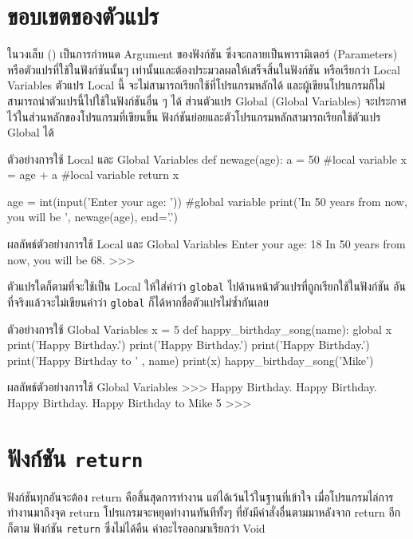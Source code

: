 \section{ขอบเขตของตัวแปร}

ในวงเล็บ () เป็นการกำหนด Argument ของฟังก์ชัน ซึ่งจะกลายเป็นพารามิเตอร์ (Parameters) หรือตัวแปรที่ใช้ในฟังก์ชันนั้นๆ เท่านั้นและต้องประมวลผลให้เสร็จสิ้นในฟังก์ชัน หรือเรียกว่า Local Variables ตัวแปร Local นี้ จะไม่สามารถเรียกใช้ที่โปรแกรมหลักได้ และผู้เขียนโปรแกรมก็ไม่สามารถนำตัวแปรนี้ไปใช้ในฟังก์ชันอื่น ๆ ได้ ส่วนตัวแปร Global (Global Variables) จะประกาศไว้ในส่วนหลักของโปรแกรมที่เขียนขึ้น ฟังก์ชันย่อยและตัวโปรแกรมหลักสามารถเรียกใช้ตัวแปร Global ได้

\begin{codelist}{ตัวอย่างการใช้ Local และ Global Variables}{}
def newage(age):
    a = 50 #local variable
    x = age + a #local variable
    return x

age = int(input('Enter your age: ')) #global variable
print('In 50 years from now, you will be ', newage(age), end='.')
\end{codelist}

\begin{codelist}{ผลลัพธ์ตัวอย่างการใช้ Local และ Global Variables}{}
Enter your age: 18
In 50 years from now, you will be  68.
>>> 
\end{codelist}


ตัวแปรใดก็ตามที่จะใช้เป็น Local ให้ใส่คำว่า \texttt{global} ไปด้านหน้าตัวแปรที่ถูกเรียกใช้ในฟังก์ชัน อันที่จริงแล้วจะไม่เขียนคำว่า \texttt{global}  ก็ได้หากชื่อตัวแปรไม่ซ้ำกันเลย

\begin{codelist}{ตัวอย่างการใช้ Global Variables}{}
x = 5
def happy_birthday_song(name):
    global x
    print('Happy Birthday.')
    print('Happy Birthday.')
    print('Happy Birthday.')
    print('Happy Birthday to ' , name)
    print(x)
happy_birthday_song('Mike')
\end{codelist}

\begin{codelist}{ผลลัพธ์ตัวอย่างการใช้ Global Variables}{}
>>>
Happy Birthday.
Happy Birthday.
Happy Birthday.
Happy Birthday to Mike
5
>>>
\end{codelist}

\section{ฟังก์ชัน \texttt{return}}

ฟังก์ชันทุกอันจะต้อง return คือสิ้นสุดการทำงาน แต่ได้เว้นไว้ในฐานที่เข้าใจ เมื่อโปรแกรมไล่การทำงานมาถึงจุด return โปรแกรมจะหยุดทำงานทันทีทั้งๆ ที่ยังมีคำสั่งอื่นตามมาหลังจาก return อีกก็ตาม  ฟังก์ชัน \texttt{return} ซึ่งไม่ได้คืน ค่าอะไรออกมาเรียกว่า Void 


